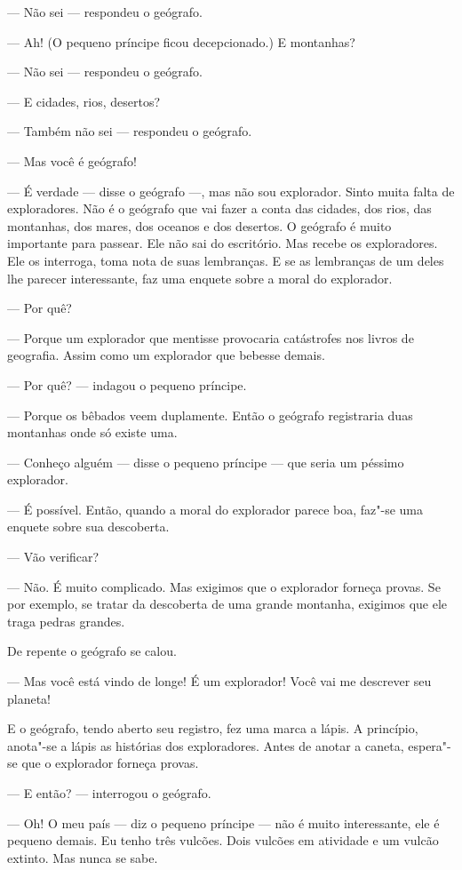 \begin{Parallel}[p]{}{}
{--- Não sei --- respondeu o geógrafo.

--- Ah! (O pequeno príncipe ficou decepcionado.) E montanhas?

--- Não sei --- respondeu o geógrafo.

--- E cidades, rios, desertos?

--- Também não sei --- respondeu o geógrafo.

--- Mas você é geógrafo!

--- É verdade --- disse o geógrafo ---, mas não sou explorador. Sinto muita
falta de exploradores. Não é o geógrafo que vai fazer a conta das
cidades, dos rios, das montanhas, dos mares, dos oceanos e dos desertos.
O geógrafo é muito importante para passear. Ele não sai do escritório.
Mas recebe os exploradores. Ele os interroga, toma nota de suas
lembranças. E se as lembranças de um deles lhe parecer interessante, faz
uma enquete sobre a moral do explorador.

--- Por quê?

--- Porque um explorador que mentisse provocaria catástrofes nos livros de
geografia. Assim como um explorador que bebesse demais.

--- Por quê? --- indagou o pequeno príncipe.

--- Porque os bêbados veem duplamente. Então o geógrafo registraria duas
montanhas onde só existe uma.

--- Conheço alguém --- disse o pequeno príncipe --- que seria um péssimo
explorador.

--- É possível. Então, quando a moral do explorador parece boa, faz"-se uma
enquete sobre sua descoberta.

--- Vão verificar?

--- Não. É muito complicado. Mas exigimos que o explorador forneça provas.
Se por exemplo, se tratar da descoberta de uma grande montanha, exigimos
que ele traga pedras grandes.

De repente o geógrafo se calou.

--- Mas você está vindo de longe! É um explorador! Você vai me descrever
seu planeta!

E o geógrafo, tendo aberto seu registro, fez uma marca a lápis. A
princípio, anota"-se a lápis as histórias dos exploradores. Antes de
anotar a caneta, espera"-se que o explorador forneça provas.

--- E então? --- interrogou o geógrafo.

--- Oh! O meu país --- diz o pequeno príncipe --- não é muito interessante,
ele é pequeno demais. Eu tenho três vulcões. Dois vulcões em atividade e
um vulcão extinto. Mas nunca se sabe.

}
\end{Parallel}
